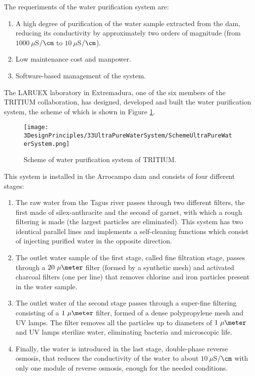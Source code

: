 The requeriments of the water purification system are:

\begin{enumerate}

\item{} A high degree of purification of the water sample extracted from the dam, reducing its conductivity by approximately two orders of magnitude (from $1000~\mu$S$/\cm$ to $10~\mu$S$/\cm$).

\item{} Low maintenance cost  and manpower.

\item{} Software-based management of the system.
\end{enumerate}

The LARUEX laboratory in Extremadura, one of the six members of the TRITIUM collaboration, has designed, developed and built the water purification system, the scheme of which is shown in Figure \ref{fig:WPSScheme}.

\begin{figure}[htbp]
\centering
\texttt{[image: 3DesignPrinciples/33UltraPureWaterSystem/SchemeUltraPureWaterSystem.png]}
\caption{Scheme of water purification system of TRITIUM.\label{fig:WPSScheme}}
\end{figure}

This system is installed in the Arrocampo dam and consists of four different stages:

\begin{enumerate}
\item{} The raw water from the Tagus river passes through two different filters, the first made of silex-anthracite and the second of garnet, with which a rough filtering is made (the largest particles are eliminated). This system has two identical parallel lines and implements a self-cleaning functions which consist of injecting purified water in the opposite direction.

\item{} The outlet water sample of the first stage, called fine filtration stage, passes through a $20~\mu\meter$ filter (formed by a synthetic mesh) and activated charcoal filters (one per line) that removes chlorine and iron particles present in the water sample.

\item{} The outlet water of the second stage passes through a super-fine filtering consisting of a $1~\mu\meter$ filter, formed of a dense polypropylene mesh and UV lamps. The filter removes all the particles up to diameters of $1~\mu\meter$ and UV lamps sterilize water, eliminating bacteria and microscopic life.

\item{} Finally, the water is introduced in the last stage, double-phase reverse osmosis, that reduces the conductivity of the water to about $10~\mu$S$/\cm$ with only one module of reverse osmosis, enough for the needed conditions. 

\end{enumerate}

